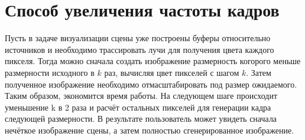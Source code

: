 \section {Способ увеличения частоты кадров} {
    Пусть в задаче визуализации сцены уже построены буферы относительно источников
    и необходимо трассировать лучи для получения цвета каждого пикселя.
    Тогда можно сначала создать изображение размерность когорого меньше размерности
    исходного в $k$ раз, вычисляя цвет пикселей с шагом $k$.
    Затем полученное изображение необходимо отмасштабировать под размер ожидаемого.
    Таким образом, экономится время работы.
    На следующем шаге происходит уменьшение k в 2 раза и расчёт остальных пикселей
    для генерации кадра следующей размерности.
    В результате пользователь может увидеть сначала нечёткое изображение сцены,
    а затем полностью сгенерированное изображение.
}